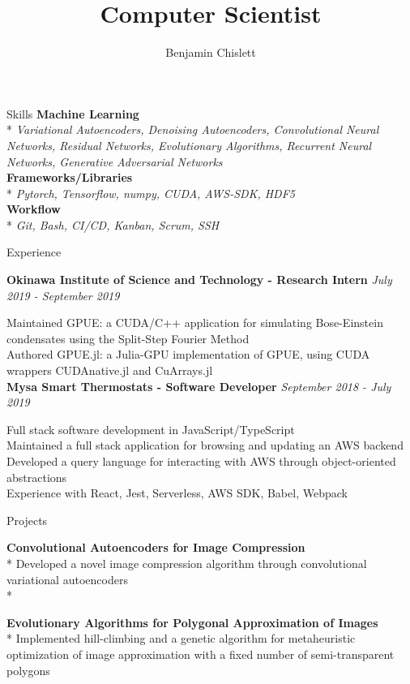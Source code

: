 \documentclass[11pt, letterpaper]{article}
\title{Computer Scientist}
\author{Benjamin Chislett}
\date{}
\begin{document}
\begin{center}
  \Huge\theauthor
  \par
  \huge\thetitle
  \par
\end{center}

\begin{section}{Skills}
\textbf{Machine Learning}\\*
\textit{Variational Autoencoders, Denoising Autoencoders, Convolutional Neural Networks, Residual Networks, Evolutionary Algorithms, Recurrent Neural Networks, Generative Adversarial Networks}\\

\textbf{Frameworks/Libraries}\\*
\textit{Pytorch, Tensorflow, numpy, CUDA, AWS-SDK, HDF5}\\

\textbf{Workflow}\\*
\textit{Git, Bash, CI/CD, Kanban, Scrum, SSH}
\end{section}

\begin{section}{Experience}

\textbf{Okinawa Institute of Science and Technology - Research Intern}
\hfill
\textit{July 2019 - September 2019}

Maintained GPUE: a CUDA/C++ application for simulating Bose-Einstein condensates using the Split-Step Fourier Method\\
Authored GPUE.jl: a Julia-GPU implementation of GPUE, using CUDA wrappers CUDAnative.jl and CuArrays.jl\\

\textbf{Mysa Smart Thermostats - Software Developer}
\hfill
\textit{September 2018 - July 2019}

Full stack software development in JavaScript/TypeScript\\
Maintained a full stack application for browsing and updating an AWS backend\\
Developed a query language for interacting with AWS through object-oriented abstractions\\
Experience with React, Jest, Serverless, AWS SDK, Babel, Webpack
\end{section}

\begin{section}{Projects}

\textbf{Convolutional Autoencoders for Image Compression}\\*
Developed a novel image compression algorithm through convolutional variational autoencoders\\*

\textbf{Evolutionary Algorithms for Polygonal Approximation of Images}\\*
Implemented hill-climbing and a genetic algorithm for metaheuristic optimization of image approximation with a fixed number of semi-transparent polygons
\end{section}
\end{document}
